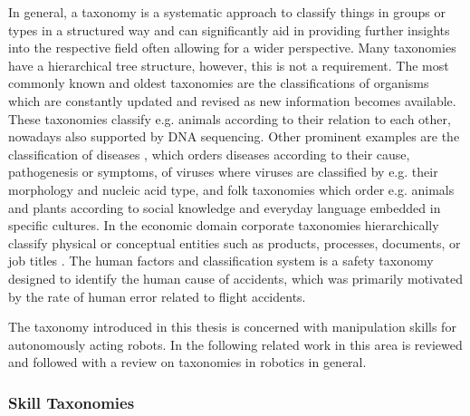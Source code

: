 In general, a taxonomy is a systematic approach to classify things in groups or types in a structured way and can significantly aid in providing further insights into the respective field often allowing for a wider perspective.
Many taxonomies have a hierarchical tree structure, however, this is not a requirement.
The most commonly known and oldest taxonomies are the classifications of organisms \cite{CavalierSmith.1998} which are constantly updated and revised as new information becomes available.
These taxonomies classify e.g. animals according to their relation to each other, nowadays also supported by DNA sequencing.
Other prominent examples are the classification of diseases \cite{Snider.2003}, which orders diseases according to their cause, pathogenesis or symptoms, of viruses \cite{Adams.2013} where viruses are classified by e.g. their morphology and nucleic acid type, and folk taxonomies \cite{Park.2003} which order e.g. animals and plants according to social knowledge and everyday language embedded in specific cultures.
In the economic domain corporate taxonomies hierarchically classify physical or conceptual entities such as products, processes, documents, or job titles \cite{DelphiGroup.2004}.
The human factors and classification system \cite{Wiegmann.2017} is a safety taxonomy designed to identify the human cause of accidents, which was primarily motivated by the rate of human error related to flight accidents.


The taxonomy introduced in this thesis is concerned with manipulation skills for autonomously acting robots.
In the following related work in this area is reviewed and followed with a review on taxonomies in robotics in general.

\subsubsection{Skill Taxonomies}

